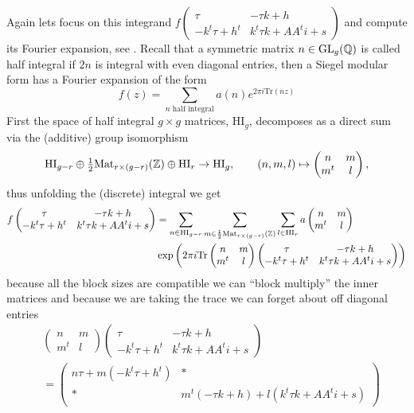 Again lets focus on this integrand \(f\begin{pmatrix} \tau & -\tau k + h\\ -k^t \tau + h^t & k^t \tau k + A A^t i + s \end{pmatrix}\) and compute its Fourier expansion, see \cite[3.4]{bruinier123ModularForms2008}. Recall that a symmetric matrix \(n\in \GL_g(\Q)\) is called half integral if \(2n\) is integral with even diagonal entries, then a Siegel modular form has a Fourier expansion of the form
\[f(z) = \sum_{n \text{ half integral}}a(n) e^{2\pi i \mathrm{Tr}(nz)} \]
First the space of half integral \(g\times g\) matrices, \(\mathrm{HI}_g\), decomposes as a direct sum via the (additive) group isomorphism
\[ \mathrm{HI}_{g-r} \oplus \tfrac{ 1}{ 2} \mathrm{Mat}_{ r\times (g-r)}(\Z) \oplus \mathrm{HI}_{r}\to\mathrm{HI}_g, \qquad (n, m, l)\mapsto \begin{pmatrix} n & m\\ m^t & l \end{pmatrix}, \]
thus unfolding the (discrete) integral we get 
\begin{align*}
	f\begin{pmatrix} \tau & -\tau k + h\\ -k^t \tau + h^t & k^t \tau k + A A^t i + s \end{pmatrix} &=   \sum_{n\in\mathrm{HI}_{g-r}} \sum_{m\in\frac{1}{2} \mathrm{Mat}_{ r\times (g-r)}(\Z)} \sum_{l\in\mathrm{HI}_{r}} a\begin{pmatrix} n & m\\ m^t & l \end{pmatrix} \\
	&\exp \left(2\pi i \mathrm{Tr} \begin{pmatrix} n & m\\ m^t & l \end{pmatrix}\begin{pmatrix} \tau & -\tau k + h\\ -k^t \tau + h^t & k^t \tau k + A A^t i + s \end{pmatrix} \right)  \\
\end{align*}
because all the block sizes are compatible we can ``block multiply'' the inner matrices and because we are taking the trace we can forget about off diagonal entries
\begin{align*}
	&\begin{pmatrix} n & m\\ m^t & l \end{pmatrix}\begin{pmatrix} \tau & -\tau k + h\\ -k^t \tau + h^t & k^t \tau k + A A^t i + s \end{pmatrix}\\ &= 
	\begin{pmatrix} n\tau + m(-k^t \tau + h^t ) & \ast\\ \ast & m^t(-\tau k + h) + l( k^t \tau k + A A^t i + s) \end{pmatrix}
\end{align*}
